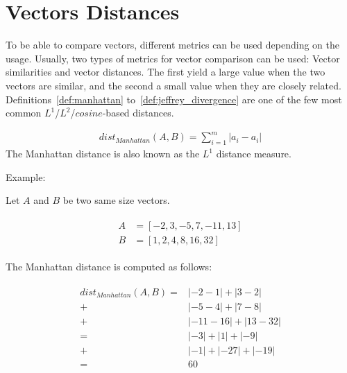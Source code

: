 \section{Vectors Distances \label{sec:vectors_distances}}

To be able to compare vectors, different metrics can be used depending on the usage.
Usually, two types of metrics for vector comparison can be used: Vector similarities and vector distances.
The first yield a large value when the two vectors are similar, and the second a small value when they are closely related.
Definitions~\ref{def:manhattan} to~\ref{def:jeffrey_divergence} are one of the few most common $L^1$/$L^2$/$cosine$-based distances.

\begin{definition}
  \begin{gather*}
    dist_{Manhattan}(A, B) = \sum_{i=1}^{m} |a_i - a_i|
  \end{gather*}
  The Manhattan distance is also known as the $L^1$ distance measure.

  Example:

  Let $A$ and $B$ be two same size vectors.

  \begin{gather*}
    \begin{aligned}
      A &= \left[-2, 3, -5, 7, -11, 13 \right] \\
      B &= \left[1, 2, 4, 8, 16, 32 \right]
    \end{aligned}
  \end{gather*}

  The Manhattan distance is computed as follows:

  \begin{gather*}
    \begin{aligned}
      dist_{Manhattan}(A, B) =& |-2 - 1| + |3 - 2| \\
                             +& |-5 - 4| + |7 - 8| \\
                             +& |-11 - 16| + |13 - 32| \\
                             =& |-3| + |1| + |-9| \\
                             +& |-1| + |-27| + |-19| \\
                             =& 60
    \end{aligned}
  \end{gather*}
\end{definition}

